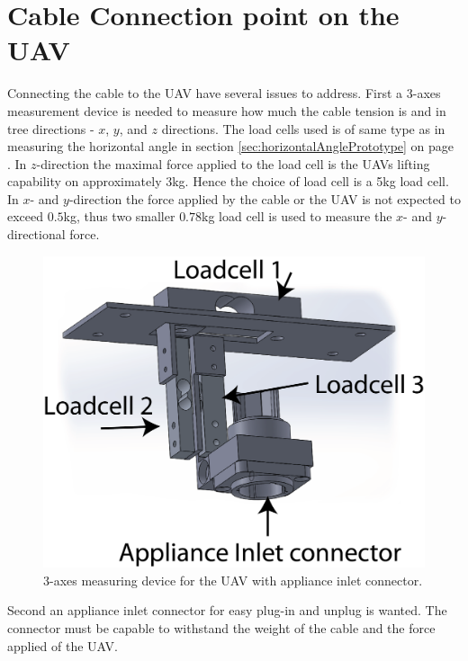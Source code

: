 \section{Cable Connection point on the UAV}
Connecting the cable to the UAV have several issues to address. First a 3-axes measurement device is needed to measure how much the cable tension is and in tree directions - $x$, $y$, and $z$ directions. The load cells used is of same type as in measuring the horizontal angle in section \ref{sec:horizontalAnglePrototype} on page \pageref{sec:horizontalAnglePrototype}. In $z$-direction the maximal force applied to the load cell is the UAVs lifting capability on approximately 3kg. Hence the choice of load cell is a 5kg load cell.\\
\noindent
In $x$- and $y$-direction the force applied by the cable or the UAV is not expected to exceed $0.5$kg, thus two smaller $0.78$kg load cell is used to measure the $x$- and $y$-directional force. 

\begin{figure}[hbtp]
\centering
\includegraphics[scale=0.5]{graphics/cad/hexa.png}
\caption{3-axes measuring device for the UAV with appliance inlet connector.}
\end{figure}


\noindent
Second an appliance inlet connector for easy plug-in and unplug is wanted. The connector must be capable to withstand the weight of the cable and the force applied of the UAV. 

